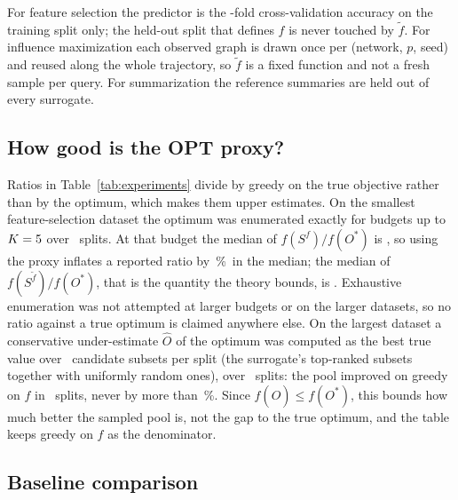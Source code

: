 For feature selection the predictor is the \EOneCVFolds-fold
cross-validation accuracy on the training split only; the held-out split that
defines $f$ is never touched by $\tilde f$.  For influence maximization each
observed graph is drawn once per (network, $p$, seed) and reused along the
whole trajectory, so $\tilde f$ is a fixed function and not a fresh sample
per query.  For summarization the reference summaries are held out of every
surrogate.

\subsection{How good is the OPT proxy?}\label{app:exp-opt}

Ratios in Table~\ref{tab:experiments} divide by greedy on the true objective
rather than by the optimum, which makes them upper estimates.  On the
smallest feature-selection dataset the optimum was enumerated exactly for
budgets up to $K=5$ over \EOneBreastOptSeeds\ splits.  At that
budget the median of $f(S^{f})/f(O^{\ast})$ is \EOneBreastOptGreedyF, so
using the proxy inflates a reported ratio by \EOneBreastOptInflationPct\,\%\
in the median; the median of $f(S^{\tilde f})/f(O^{\ast})$, that is the
quantity the theory bounds, is \EOneBreastOptGreedyFtilde.  Exhaustive
enumeration was not attempted at larger budgets or on the larger datasets,
so no ratio against a true optimum is claimed anywhere else.
On the largest dataset a conservative under-estimate $\hat O$ of the
optimum was computed as the best true value over
\EOneAirlineOptHatCands\ candidate subsets per split (the surrogate's
top-ranked subsets together with uniformly random ones), over
\EOneAirlineOptHatSeeds\ splits: the pool improved on greedy on $f$ in
\EOneAirlineOptHatBetterSeeds\ splits, never by more than
\EOneAirlineOptHatMaxImpPct\,\%.  Since $f(\hat O)\le f(O^{\ast})$, this
bounds how much better the sampled pool is, not the gap to the true
optimum, and the table keeps greedy on $f$ as the denominator.

\subsection{Baseline comparison}\label{app:exp-baselines}

